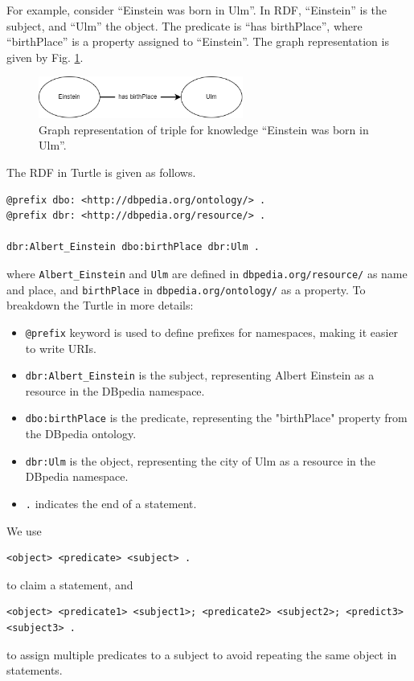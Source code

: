 For example, consider ``Einstein was born in Ulm''. In RDF, ``Einstein'' is the subject, and ``Ulm'' the object. The predicate is ``has birthPlace'', where ``birthPlace'' is a property assigned to ``Einstein''. The graph representation is given by Fig. \ref{fig:einsteinexp}.
\begin{figure}[htbp]
	\centering
	\includegraphics[width=0.6\textwidth]{chapters/part-4/figures/einsteinexp.png}
	\caption{Graph representation of triple for knowledge ``Einstein was born in Ulm''.}
	\label{fig:einsteinexp}
\end{figure}
The RDF in Turtle is given as follows.
\begin{lstlisting}
@prefix dbo: <http://dbpedia.org/ontology/> .
@prefix dbr: <http://dbpedia.org/resource/> .

dbr:Albert_Einstein dbo:birthPlace dbr:Ulm .
\end{lstlisting}
where \verb|Albert_Einstein| and \verb|Ulm| are defined in \verb|dbpedia.org/resource/| as name and place, and \verb|birthPlace| in \verb|dbpedia.org/ontology/| as a property. To breakdown the Turtle in more details:
\begin{itemize}
  \item \verb|@prefix| keyword is used to define prefixes for namespaces, making it easier to write URIs.
  \item \verb|dbr:Albert_Einstein| is the subject, representing Albert Einstein as a resource in the DBpedia namespace.
  \item \verb|dbo:birthPlace| is the predicate, representing the "birthPlace" property from the DBpedia ontology.
  \item \verb|dbr:Ulm| is the object, representing the city of Ulm as a resource in the DBpedia namespace.
  \item \verb|.| indicates the end of a statement.
\end{itemize}

We use
\begin{lstlisting}
<object> <predicate> <subject> .
\end{lstlisting}
to claim a statement, and
\begin{lstlisting}
<object> <predicate1> <subject1>; <predicate2> <subject2>; <predict3> <subject3> .
\end{lstlisting}
to assign multiple predicates to a subject to avoid repeating the same object in statements.

